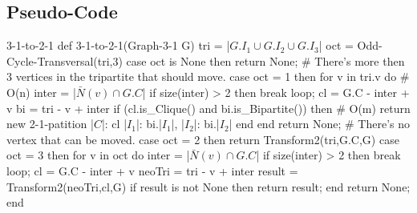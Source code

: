 \subsection{Pseudo-Code}

\begin{code}{3-1-to-2-1}
def 3-1-to-2-1(Graph-3-1 G)
  tri = |$G.I_1 \cup G.I_2 \cup G.I_3$|
  oct = Odd-Cycle-Transversal(tri,3)
  case oct is None then
    return None; # There's more then 3 vertices in the tripartite that should move.
  case oct = 1 then
    for v in tri.v do # O(n)
      inter = |$\bar{N}(v) \cap G.C$|
      if size(inter) > 2 then
        break loop;
      cl = G.C - inter + v
      bi = tri - v + inter
      if (cl.is_Clique() and bi.is_Bipartite()) then # O(m)
        return new 2-1-patition{
          |$C$|: cl
          |$I_1$|: bi.|$I_1$|,
          |$I_2$|: bi.|$I_2$|
        }
      end
    end
    return None; # There's no vertex that can be moved.
  case oct = 2 then
    return Transform2(tri,G.C,G)
  case oct = 3 then
    for v in oct do
      inter = |$\bar{N}(v) \cap G.C$|
      if size(inter) > 2 then
        break loop;
      cl = G.C - inter + v
      neoTri = tri - v + inter
      result = Transform2(neoTri,cl,G)
      if result is not None then
        return result;
    end
    return None;
end
\end{code}

